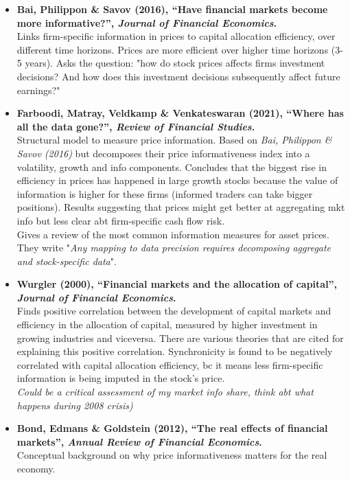 \documentclass[11pt,a4paper]{article}
\begin{document}
\begin{itemize}
  \item \textbf{Bai, Philippon \& Savov (2016), ``Have financial markets become more informative?'', \emph{Journal of Financial Economics}.}\\
  Links firm-specific information in prices to capital allocation efficiency, over different time horizons. Prices are more efficient over higher time horizons (3-5 years). Asks the question: "how do stock prices affects firms investment decisions? And how does this investment decisions subsequently affect future earnings?"

  \item \textbf{Farboodi, Matray, Veldkamp \& Venkateswaran (2021), ``Where has all the data gone?'', \emph{Review of Financial Studies}.}\\
  Structural model to measure price information. Based on \textit{Bai, Philippon \& Savov (2016)} but decomposes their price informativeness index into a volatility, growth and info components. Concludes that the biggest rise in efficiency in prices has happened in large growth stocks because the value of information is higher for these firms (informed traders can take bigger positions).
  Results suggesting that prices might get better at aggregating mkt info but less clear abt firm-specific cash flow risk.\\
  Gives a review of the most common information measures for asset prices.\\
  They write "\textit{Any mapping to data precision requires decomposing aggregate and stock-specific data}".

  \item \textbf{Wurgler (2000), ``Financial markets and the allocation of capital'', \emph{Journal of Financial Economics}.}\\
  Finds positive correlation between the development of capital markets and efficiency in the allocation of capital, measured by higher investment in growing industries and viceversa.
  There are various theories that are cited for explaining this positive correlation.
  Synchronicity is found to be negatively correlated with capital allocation efficiency, bc it means less firm-specific information is being imputed in the stock's price.\\
  \textit{Could be a critical assessment of my market info share, think abt what happens during 2008 crisis)}

  \item \textbf{Bond, Edmans \& Goldstein (2012), ``The real effects of financial markets'', \emph{Annual Review of Financial Economics}.}\\
  Conceptual background on why price informativeness matters for the real economy.
\end{itemize}
\end{document}
